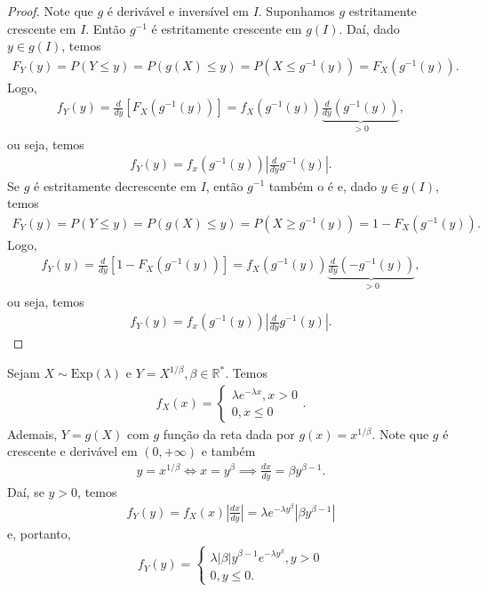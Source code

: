\documentclass[../Notas.tex]{subfiles}
\begin{document}
\begin{proof}
Note que $g$ é derivável e inversível em $I$. Suponhamos $g$ estritamente crescente em $I$. Então $g^{-1}$ é estritamente crescente em $g(I)$. Daí, dado $y\in g(I)$, temos
\begin{align*}
    F_Y(y) = P(Y\leq y) = P(g(X)\leq y) = P(X\leq g^{-1}(y)) = F_X(g^{-1}(y)).
\end{align*}
Logo,
\begin{align*}
    f_Y(y) = \frac{d}{dy}\left[ F_X(g^{-1}(y)) \right] = f_X(g^{-1}(y))\underbrace{\frac{d}{dy}(g^{-1}(y))}_{>0},
\end{align*}
ou seja, temos
\begin{align*}
    f_Y(y) = f_x(g^{-1}(y))\left| \frac{d}{dy}g^{-1}(y)\right|.
\end{align*}
Se $g$ é estritamente decrescente em $I$, então $g^{-1}$ também o é e, dado $y\in g(I)$, temos
\begin{align*}
    F_Y(y) = P(Y\leq y) = P(g(X)\leq y) = P(X\geq g^{-1}(y)) = 1 - F_X(g^{-1}(y)).
\end{align*}
Logo,
\begin{align*}
    f_Y(y) = \frac{d}{dy}\left[1 - F_X(g^{-1}(y)) \right] = f_X(g^{-1}(y))\underbrace{\frac{d}{dy}(-g^{-1}(y))}_{>0},
\end{align*}
ou seja, temos
\begin{align*}
    f_Y(y) = f_x(g^{-1}(y))\left| \frac{d}{dy}g^{-1}(y)\right|.
\end{align*}
\end{proof}

\begin{example}
Sejam $X\sim\text{Exp}(\lambda)$ e $Y = X^{1/\beta}, \beta\in\mathbb{R}^*$. Temos
\begin{align*}
    f_X(x) = \begin{cases}
    \lambda e^{-\lambda x}, x > 0 \\
    0, x\leq 0
    \end{cases}.
\end{align*}
Ademais, $Y = g(X)$ com $g$ função da reta dada por $g(x) = x^{1/\beta}$. Note que $g$ é crescente e derivável em $(0, +\infty)$ e também
\begin{align*}
    y = x^{1/\beta} \iff x = y^{\beta} \implies \frac{dx}{dy} = \beta y^{\beta - 1}.
\end{align*}
Daí, se $y>0$, temos
\begin{align*}
    f_Y(y) = f_X(x)\left|\frac{dx}{dy}\right| = \lambda e^{-\lambda y^{\beta}}|\beta y^{\beta -1}|
\end{align*}
e, portanto,
\begin{align*}
    f_Y(y) = \begin{cases}
    \lambda |\beta| y^{\beta - 1}e^{-\lambda y^{\beta}}, y> 0 \\
    0, y\leq 0.
    \end{cases}
\end{align*}
\end{example}
\end{document}
